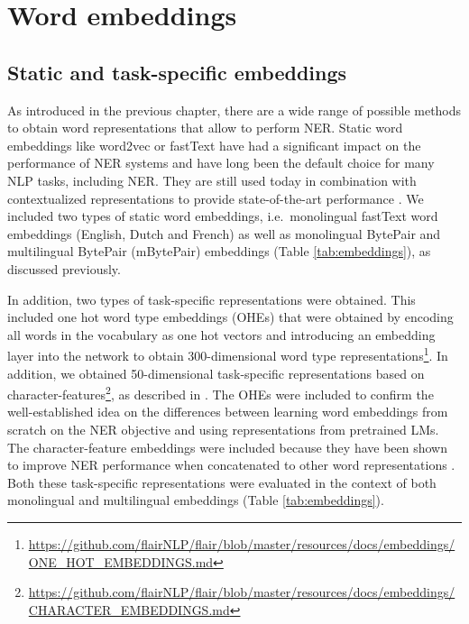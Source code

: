 \documentclass[12pt,a4paper,]{book}
\begin{document}
\hypertarget{word-embeddings}{%
\section{Word embeddings}\label{word-embeddings}}

\hypertarget{static-and-task-specific-embeddings}{%
\subsection{Static and task-specific embeddings}\label{static-and-task-specific-embeddings}}

As introduced in the previous chapter, there are a wide range of possible methods to obtain word representations that allow to perform NER. Static word embeddings like word2vec or fastText have had a significant impact on the performance of NER systems and have long been the default choice for many NLP tasks, including NER. They are still used today in combination with contextualized representations to provide state-of-the-art performance \citep{akbik2018}. We included two types of static word embeddings, i.e.~monolingual fastText word embeddings (English, Dutch and French) as well as monolingual BytePair and multilingual BytePair (mBytePair) embeddings (Table \ref{tab:embeddings}), as discussed previously.

In addition, two types of task-specific representations were obtained. This included one hot word type embeddings (OHEs) that were obtained by encoding all words in the vocabulary as one hot vectors and introducing an embedding layer into the network to obtain 300-dimensional word type representations\footnote{\url{https://github.com/flairNLP/flair/blob/master/resources/docs/embeddings/ONE_HOT_EMBEDDINGS.md}}. In addition, we obtained 50-dimensional task-specific representations based on character-features\footnote{\url{https://github.com/flairNLP/flair/blob/master/resources/docs/embeddings/CHARACTER_EMBEDDINGS.md}}, as described in \citep{lample2016}. The OHEs were included to confirm the well-established idea on the differences between learning word embeddings from scratch on the NER objective and using representations from pretrained LMs. The character-feature embeddings were included because they have been shown to improve NER performance when concatenated to other word representations \citep{akbik2018, lample2016}. Both these task-specific representations were evaluated in the context of both monolingual and multilingual embeddings (Table \ref{tab:embeddings}).
\end{document}
